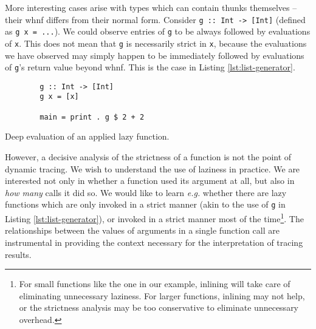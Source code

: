 \documentclass[thesis=B,english]{FITthesis}[2019/12/23]
\newcommand{\eg}{\emph{e.g.}\xspace}
\newcommand{\hsIdent}[1]{\texttt{#1}}
\newcommand{\hsCode}[1]{\texttt{#1}}
\begin{document}
More interesting cases arise with types which can contain thunks themselves --
their \acrlong{whnf} differs from their normal form. Consider \hsCode{g :: Int
-> [Int]} (defined as \hsCode{g x = ...}). We could observe entries of
\hsIdent{g} to be always followed by evaluations of \hsIdent{x}. This does not
mean that \hsIdent{g} is necessarily strict in \hsIdent{x}, because the
evaluations we have observed may simply happen to be immediately followed by
evaluations of \hsIdent{g}'s return value beyond \acrshort{whnf}. This is the
case in Listing \ref{lst:list-generator}.

\begin{listing}[h]
	\centering
	\begin{verbatim}
		g :: Int -> [Int]
		g x = [x]

		main = print . g $ 2 + 2
	\end{verbatim}
	\caption{Deep evaluation of an applied lazy function.}
	\label{lst:list-generator}
\end{listing}

However, a decisive analysis of the strictness of a function is not the point
of dynamic tracing. We wish to understand the use of laziness in practice. We
are interested not only in whether a function used its argument at all, but
also in \textit{how many} calls it did so. We would like to learn \eg whether
there are lazy functions which are only invoked in a strict manner (akin to the
use of \hsIdent{g} in Listing \ref{lst:list-generator}), or invoked in a strict
manner most of the time\footnote{
	For small functions like the one in our example, inlining will take care of
	eliminating unnecessary laziness. For larger functions, inlining may not
	help, or the strictness analysis may be too conservative to eliminate
	unnecessary overhead.
}. The relationships between the values of arguments in a single function call
are instrumental in providing the context necessary for the interpretation of
tracing results.
\end{document}
